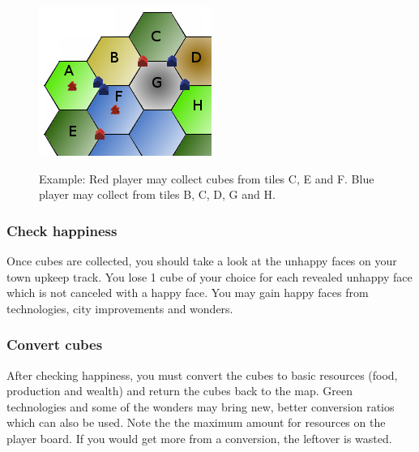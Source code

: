 \documentclass[11pt,a4paper,titlepage]{article}
\begin{document}
{{{      \begin{figure}[!htb]
        \begin{minipage}[c]{0.2\textwidth}
          \label{fig:tech_irrigation}
          \includegraphics[scale=.6]{doe_example_cube_collection.png}
        \end{minipage}\hfill
        \begin{minipage}[c]{0.4\textwidth}
          \captionsetup{labelformat=empty, justification=justified, singlelinecheck=false}
          \caption{Example: Red player may collect cubes from tiles C, E and F.
            Blue player may collect from tiles B, C, D, G and H.}
        \end{minipage}\hfill
        \label{fig:example_cube_collection}
      \end{figure}
    }\label{subsubsec:collect_cubes}

    \subsubsection{Check happiness}{
      Once cubes are collected, you should take a look at the unhappy faces
      on your town upkeep track. You lose 1 cube of your choice for each
      revealed unhappy face which is not canceled with a happy face. You may
      gain happy faces from technologies, city improvements and wonders.
    }\label{subsubsec:check_happiness}

    \subsubsection{Convert cubes}{
      After checking happiness, you must convert the cubes to basic resources
      (food, production and wealth) and return the cubes back to the map.
      Green technologies and some of the wonders may bring new, better conversion
      ratios which can also be used. Note the the maximum amount for resources
      on the player board. If you would get more from a conversion, the leftover
      is wasted.

}}}
\end{document}
